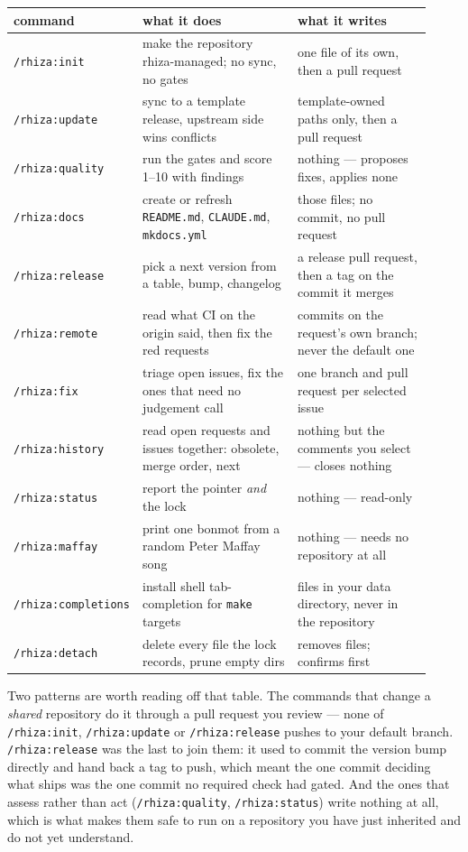 \documentclass[11pt,a4paper]{article}
\newcommand{\cmd}[1]{\texttt{/rhiza:#1}}
\newcommand{\file}[1]{\texttt{#1}}
\begin{document}
\begin{center}
\small
\begin{tabular}{@{}p{0.23\linewidth}p{0.37\linewidth}p{0.32\linewidth}@{}}
\toprule
\textbf{command} & \textbf{what it does} & \textbf{what it writes} \\
\midrule
\cmd{init} & make the repository rhiza-managed; no sync, no gates &
one file of its own, then a pull request \\[0.35em]
\cmd{update} & sync to a template release, upstream side wins conflicts &
template-owned paths only, then a pull request \\[0.35em]
\cmd{quality} & run the gates and score 1--10 with findings &
nothing --- proposes fixes, applies none \\[0.35em]
\cmd{docs} & create or refresh \file{README.md}, \file{CLAUDE.md}, \file{mkdocs.yml} &
those files; no commit, no pull request \\[0.35em]
\cmd{release} & pick a next version from a table, bump, changelog &
a release pull request, then a tag on the commit it merges \\[0.35em]
\cmd{remote} & read what CI on the origin said, then fix the red requests &
commits on the request's own branch; never the default one \\[0.35em]
\cmd{fix} & triage open issues, fix the ones that need no judgement call &
one branch and pull request per selected issue \\[0.35em]
\cmd{history} & read open requests and issues together: obsolete, merge order, next &
nothing but the comments you select --- closes nothing \\[0.35em]
\cmd{status} & report the pointer \emph{and} the lock &
nothing --- read-only \\[0.35em]
\cmd{maffay} & print one bonmot from a random Peter Maffay song &
nothing --- needs no repository at all \\[0.35em]
\cmd{completions} & install shell tab-completion for \texttt{make} targets &
files in your data directory, never in the repository \\[0.35em]
\cmd{detach} & delete every file the lock records, prune empty dirs &
removes files; confirms first \\
\bottomrule
\end{tabular}
\end{center}

\noindent
Two patterns are worth reading off that table. The commands that change a \emph{shared}
repository do it through a pull request you review --- none of \cmd{init}, \cmd{update}
or \cmd{release} pushes to your default branch. \cmd{release} was the last to join them:
it used to commit the version bump directly and hand back a tag to push, which meant the
one commit deciding what ships was the one commit no required check had gated. And the
ones that assess rather than act
(\cmd{quality}, \cmd{status}) write nothing at all, which is what makes them safe to run
on a repository you have just inherited and do not yet understand.
\end{document}

